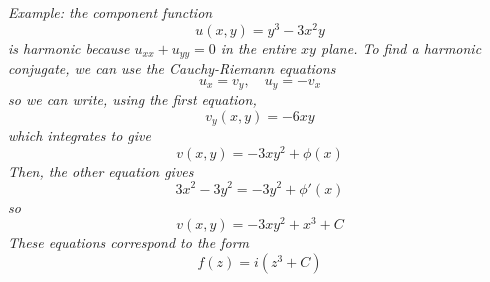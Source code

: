 \documentclass{article}
\begin{document}
\textit{Example: the component function
\[
	u(x, y) = y^3 - 3x^2y
\]
is harmonic because $u_{xx} + u_{yy} = 0$ in the entire $xy$ plane. To find a harmonic conjugate, we can use the Cauchy-Riemann equations
\[
	u_x = v_y,	\quad u_y = -v_x
\]
so we can write, using the first equation,
\[
	v_y(x, y) = -6xy
\]
which integrates to give
\[
	v(x, y) = -3xy^2 + \phi(x)
\]
Then, the other equation gives
\[
	3x^2 - 3y^2 =  -3y^2 + \phi'(x)
\]
so
\[
	v(x, y) = -3xy^2 + x^3 + C
\]
These equations correspond to the form
\[
	f(z) = i(z^3 + C)
\]
}
\end{document}
